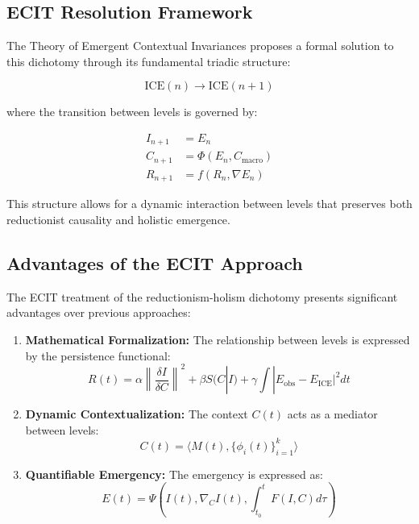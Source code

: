 \documentclass{article}
\begin{document}
\subsection{ECIT Resolution Framework}
The Theory of Emergent Contextual Invariances proposes a formal solution to this dichotomy through its fundamental triadic structure:

\begin{equation}
\text{ICE}(n) \rightarrow \text{ICE}(n+1)
\end{equation}

where the transition between levels is governed by:

\begin{align}
I_{n+1} &= E_n \\
C_{n+1} &= \Phi(E_n, C_{\text{macro}}) \\
R_{n+1} &= f(R_n, \nabla E_n)
\end{align}

This structure allows for a dynamic interaction between levels that preserves both reductionist causality and holistic emergence.

\subsection{Advantages of the ECIT Approach}

The ECIT treatment of the reductionism-holism dichotomy presents significant advantages over previous approaches:

\begin{enumerate}
    \item \textbf{Mathematical Formalization:} The relationship between levels is expressed by the persistence functional:
    \begin{equation}
    R(t) = \alpha \left\|\frac{\delta I}{\delta C}\right\|^2 + \beta S(C|I) + \gamma \int |E_{\text{obs}} - E_{\text{ICE}}|^2 dt
    \end{equation}
    
    \item \textbf{Dynamic Contextualization:} The context $C(t)$ acts as a mediator between levels:
    \begin{equation}
    C(t) = \langle M(t), \{\phi_i(t)\}_{i=1}^k \rangle
    \end{equation}
    
    \item \textbf{Quantifiable Emergency:} The emergency is expressed as:
    \begin{equation}
    E(t) = \Psi\left(I(t), \nabla_C I(t), \int_{t_0}^t F(I,C)d\tau\right)
    \end{equation}
\end{enumerate}
\end{document}
